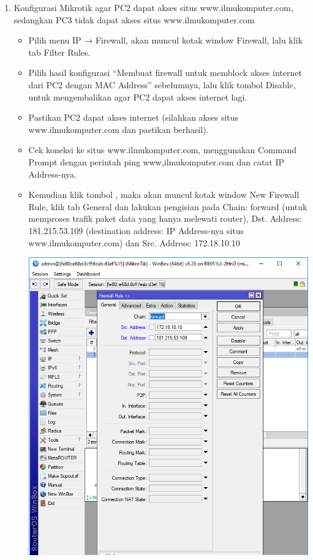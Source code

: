 \documentclass[a4paper,12pt]{article}
\begin{document}
\begin{enumerate}
\begin{itemize}
\begin{center}
                \end{center}
        \end{itemize}

    \item Konfigurasi Mikrotik agar PC2 dapat akses situs www.ilmukomputer.com, sedangkan PC3 tidak dapat akses situs www.ilmukomputer.com
        \begin{itemize}
            \item Pilih menu IP → Firewall, akan muncul kotak window Firewall, lalu klik tab Filter Rules.
            \item Pilih hasil konfigurasi “Membuat firewall untuk memblock akses internet dari PC2 dengan MAC Address” sebelumnya, lalu klik tombol Disable, untuk mengembalikan agar PC2 dapat akses internet lagi.
            \item Pastikan PC2 dapat akses internet (silahkan akses situs www.ilmukomputer.com dan pastikan berhasil).
            \item Cek koneksi ke situs www.ilmukomputer.com, menggunakan Command Prompt dengan perintah ping www,ilmukomputer.com dan catat IP Address-nya.
            \item Kemudian klik tombol  , maka akan muncul kotak window New Firewall Rule, klik tab General dan lakukan pengisian pada Chain: forward (untuk memproses trafik paket data yang hanya melewati router), Dst. Address: 181.215.53.109 (destination address: IP Address-nya situs www.ilmukomputer.com) dan Src. Address: 172.18.10.10
                \begin{center}
                    \includegraphics[width=0.8\linewidth]{image23.png}

\end{center}
\end{itemize}
\end{enumerate}
\end{document}
